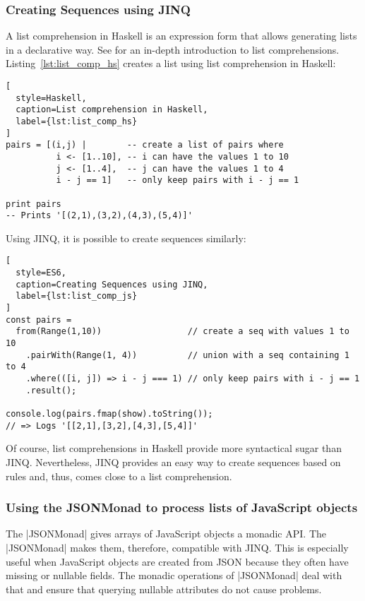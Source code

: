 \subsubsection{Creating Sequences using JINQ} %
\label{subsub:Creating Sequences using JINQ}
A list comprehension in Haskell is an expression form that allows generating
lists in a declarative way. See \cite[Ch. 5]{hutton_pih_2016} for an
in-depth introduction to list comprehensions. \\
Listing~\ref{lst:list_comp_hs} creates a list using list comprehension in
Haskell:

\begin{lstlisting}[
  style=Haskell,
  caption=List comprehension in Haskell,
  label={lst:list_comp_hs}
]
pairs = [(i,j) |        -- create a list of pairs where
          i <- [1..10], -- i can have the values 1 to 10
          j <- [1..4],  -- j can have the values 1 to 4
          i - j == 1]   -- only keep pairs with i - j == 1

print pairs
-- Prints '[(2,1),(3,2),(4,3),(5,4)]'
\end{lstlisting}

Using JINQ, it is possible to create sequences similarly:
\begin{lstlisting}[
  style=ES6,
  caption=Creating Sequences using JINQ,
  label={lst:list_comp_js}
]
const pairs =
  from(Range(1,10))                 // create a seq with values 1 to 10
    .pairWith(Range(1, 4))          // union with a seq containing 1 to 4
    .where(([i, j]) => i - j === 1) // only keep pairs with i - j == 1
    .result();

console.log(pairs.fmap(show).toString());
// => Logs '[[2,1],[3,2],[4,3],[5,4]]'
\end{lstlisting}

Of course, list comprehensions in Haskell provide more syntactical sugar than
JINQ. Nevertheless, JINQ provides an easy way to create sequences based on
rules and, thus, comes close to a list comprehension.

\subsubsection{Using the JSONMonad to process lists of JavaScript objects} %
\label{subsub:Using the JSONMonad to process lists of JavaScript objects}
The |JSONMonad| gives arrays of JavaScript objects a monadic API. The
|JSONMonad| makes them, therefore, compatible with JINQ. This is especially
useful when JavaScript objects are created from JSON because they often have
missing or nullable fields. The monadic operations of |JSONMonad| deal with
that and ensure that querying nullable attributes do not cause problems.

